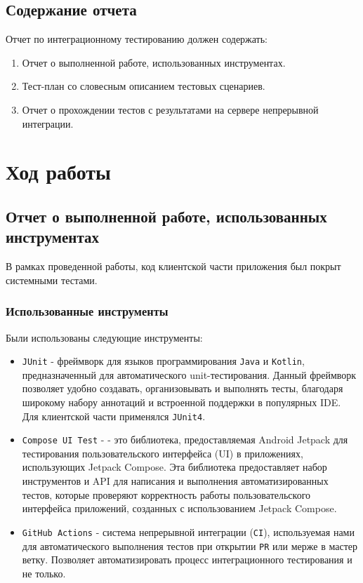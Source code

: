 \documentclass[a4paper, 14pt]{article}
\begin{document}
\subsection{Содержание отчета}

Отчет по интеграционному тестированию должен содержать:

\begin{enumerate}
    \item Отчет о выполненной работе, использованных инструментах.
    \item Тест-план со словесным описанием тестовых сценариев.
    \item Отчет о прохождении тестов с результатами на сервере непрерывной интеграции.
\end{enumerate}

\section{Ход работы}

\subsection{Отчет о выполненной работе, использованных инструментах}

В рамках проведенной работы, код клиентской части приложения был покрыт системными тестами.

\subsubsection{Использованные инструменты}

Были использованы следующие инструменты:

\begin{itemize}
    \item \texttt{JUnit} - фреймворк для языков программирования \texttt{Java} и \texttt{Kotlin}, предназначенный для автоматического unit-тестирования. Данный фреймворк позволяет удобно создавать, организовывать и выполнять тесты, благодаря широкому набору аннотаций и встроенной поддержки в популярных IDE. Для клиентской части применялся \texttt{JUnit4}.
    \item \texttt{Compose UI Test} - - это библиотека, предоставляемая Android Jetpack для тестирования пользовательского интерфейса (UI) в приложениях, использующих Jetpack Compose. Эта библиотека предоставляет набор инструментов и API для написания и выполнения автоматизированных тестов, которые проверяют корректность работы пользовательского интерфейса приложений, созданных с использованием Jetpack Compose.
    \item \texttt{GitHub Actions} - система непрерывной интеграции (\texttt{CI}), используемая нами для автоматического выполнения тестов при открытии \texttt{PR} или мерже в мастер ветку. Позволяет автоматизировать процесс интеграционного тестирования и не только.
\end{itemize}
\end{document}
